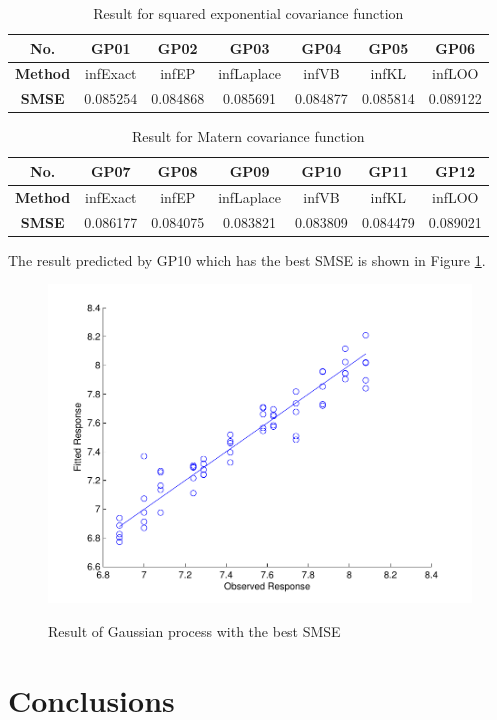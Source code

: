 \documentclass[a4paper]{article}
\begin{document}
\begin{table}[h]
\centering
\begin{tabular}{|c|c|c|c|c|c|c|}
\hline
\textbf{No.} & GP01 & GP02 & GP03 & GP04 & GP05 & GP06 \\
\hline
\textbf{Method} & infExact & infEP & infLaplace & infVB & infKL & infLOO \\
\hline
\textbf{SMSE} & 0.085254 & 0.084868 & 0.085691 & 0.084877 & 0.085814 & 0.089122 \\
\hline
\end{tabular}
\caption{Result for squared exponential covariance function}\label{table1}
\end{table}
\begin{table}[h]
\centering
\begin{tabular}{|c|c|c|c|c|c|c|}
\hline
\textbf{No.} & GP07 & GP08 & GP09 & GP10 & GP11 & GP12 \\
\hline
\textbf{Method} & infExact & infEP & infLaplace & infVB & infKL & infLOO \\
\hline
\textbf{SMSE} & 0.086177 & 0.084075 & 0.083821 & 0.083809 & 0.084479 & 0.089021 \\
\hline
\end{tabular}
\caption{Result for Matern covariance function}\label{table2}
\end{table}

The result predicted by GP10 which has the best SMSE is shown in Figure \ref{pic9}.
\begin{figure}
  \centering
  \includegraphics[width=.6\textwidth]{images/predict_GP09.pdf}\\
  \caption{Result of Gaussian process with the best SMSE}\label{pic9}
\end{figure}

\section{Conclusions}


\end{document}
